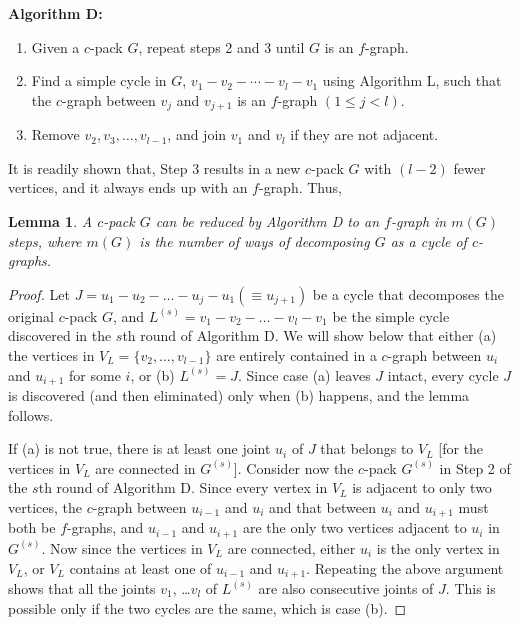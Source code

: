 \documentclass[aip,jcp,reprint,superscriptaddress]{revtex4-1}
\newtheorem{lemm}[thrm]{Lemma}
\begin{document}
\textbf{Algorithm D:}
\begin{enumerate}
  \item
    Given a $c$-pack $G$,
      repeat steps 2 and 3 until $G$ is an $f$-graph.
  \item
    Find a simple cycle in $G$,
      $v_1 - v_2 - \cdots - v_l - v_1$
      using Algorithm L,
      such that the $c$-graph between $v_j$ and $v_{j+1}$
      is an $f$-graph $(1 \le j < l)$.
  \item
    Remove $v_2, v_3, \dots, v_{l-1}$,
      and join $v_1$ and $v_l$ if they are not adjacent.
\end{enumerate}
%
It is readily shown that,
  Step 3 results in a new $c$-pack $G$
  with $(l - 2)$ fewer vertices,
  and it always ends up with an $f$-graph.
%
Thus,


\begin{lemm}
  A $c$-pack $G$ can be reduced
    by Algorithm D to an $f$-graph in $m(G)$ steps,
    where $m(G)$ is the number of ways of decomposing
    $G$ as a cycle of $c$-graphs.
\label{thm:hncdecomp}
\end{lemm}


\begin{proof}
Let $J = u_1 - u_2 - \dots - u_j - u_1 (\equiv u_{j+1})$
  be a cycle that decomposes the original $c$-pack $G$,
%
and $L^{(s)} = v_1 - v_2 - \dots - v_l - v_1$
  be the simple cycle discovered
  in the $s$th round of Algorithm D.
%
We will show below that
  either
  (a) the vertices in $V_L = \{ v_2, \dots, v_{l-1} \}$
    are entirely contained in
    a $c$-graph between $u_i$ and $u_{i+1}$ for some $i$,
  or
  (b) $L^{(s)} = J$.
%
Since case (a) leaves $J$ intact,
  every cycle $J$ is discovered (and then eliminated)
  only when (b) happens,
  and the lemma follows.
%

If (a) is not true,
  there is at least one joint $u_i$ of $J$
  that belongs to $V_L$
  [for the vertices in $V_L$ are connected in $G^{(s)}$].
%
Consider now the $c$-pack $G^{(s)}$
  in Step 2 of the $s$th round of Algorithm D.
%
Since every vertex in $V_L$ is adjacent to only two vertices,
  the $c$-graph between $u_{i-1}$ and $u_i$
  and that between $u_i$ and $u_{i+1}$
  must both be $f$-graphs,
%
and $u_{i-1}$ and $u_{i+1}$ are the only two vertices
  adjacent to $u_i$ in $G^{(s)}$.
%
Now since the vertices in $V_L$ are connected,
  either $u_i$ is the only vertex in $V_L$,
  or $V_L$ contains at least one of $u_{i-1}$ and $u_{i+1}$.
%
Repeating the above argument shows that
  all the joints $v_1$, \dots $v_l$ of $L^{(s)}$
  are also consecutive joints of $J$.
%
This is possible only if the two cycles are the same,
  which is case (b).
\end{proof}
\end{document}
